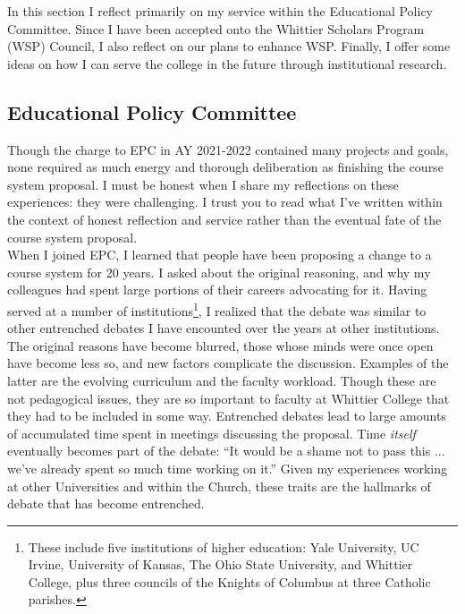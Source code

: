 \documentclass[../../../main.tex]{subfiles}
\begin{document}
\label{sec:committee_service}

In this section I reflect primarily on my service within the Educational Policy Committee.  Since I have been accepted onto the Whittier Scholars Program (WSP) Council, I also reflect on our plans to enhance WSP.  Finally, I offer some ideas on how I can serve the college in the future through institutional research.

\subsection{Educational Policy Committee}

Though the charge to EPC in AY 2021-2022 contained many projects and goals, none required as much energy and thorough deliberation as finishing the course system proposal.  I must be honest when I share my reflections on these experiences: they were challenging.  I trust you to read what I've written within the context of honest reflection and service rather than the eventual fate of the course system proposal.
\\
\vspace{0.25cm}
When I joined EPC, I learned that people have been proposing a change to a course system for 20 years.  I asked about the original reasoning, and why my colleagues had spent large portions of their careers advocating for it.  Having served at a number of institutions\footnote{These include five institutions of higher education: Yale University, UC Irvine, University of Kansas, The Ohio State University, and Whittier College, plus three councils of the Knights of Columbus at three Catholic parishes.}, I realized that the debate was similar to other entrenched debates I have encounted over the years at other institutions.  The original reasons have become blurred, those whose minds were once open have become less so, and new factors complicate the discussion.  Examples of the latter are the evolving curriculum and the faculty workload.  Though these are not pedagogical issues, they are so important to faculty at Whittier College that they had to be included in some way.  Entrenched debates lead to large amounts of accumulated time spent in meetings discussing the proposal.  Time \textit{itself} eventually becomes part of the debate: ``It would be a shame not to pass this ... we've already spent so much time working on it.''  Given my experiences working at other Universities and within the Church, these traits are the hallmarks of debate that has become entrenched.
\\
\end{document}
